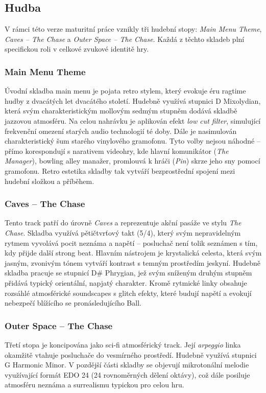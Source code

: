 \subsection{Hudba}
\label{sec:hudba}

V rámci této verze maturitní práce vznikly tři hudební stopy: \emph{Main Menu Theme}, \emph{Caves -- The Chase} a \emph{Outer Space -- The Chase}. Každá z těchto skladeb plní specifickou roli v celkové zvukové identitě hry.

\subsubsection{Main Menu Theme}
Úvodní skladba main menu je pojata retro stylem, který evokuje éru ragtime hudby z dvacátých let dvacátého století. Hudebně využívá stupnici D Mixolydian, která svým charakteristickým mollovým sedmým stupněm dodává skladbě jazzovou atmosféru. Na celou nahrávku je aplikován efekt \emph{low cut filter}, simulující frekvenční omezení starých audio technologií té doby. Dále je nasimulován charakteristický šum starého vinylového gramofonu. Tyto volby nejsou náhodné -- přímo korespondují s narativem videohry, kde hlavní komunikátor (\emph{The Manager}), bowling alley manažer, promlouvá k hráči (\emph{Pin}) skrze jeho sny pomocí gramofonu. Retro estetika skladby tak vytváří bezprostřední spojení mezi hudební složkou a příběhem.

\subsubsection{Caves -- The Chase}
Tento track patří do úrovně \emph{Caves} a reprezentuje akční pasáže ve stylu \emph{The Chase}. Skladba využívá pětičtvrťový takt (5/4), který svým nepravidelným rytmem vyvolává pocit neznáma a napětí -- posluchač není tolik seznámen s tím, kdy přijde další strong beat. Hlavním nástrojem je krystalická celesta, která svým jasným, zvonivým tónem vytváří kontrast s temným prostředím jeskyní. Hudebně skladba pracuje se stupnicí D\# Phrygian, jež svým sníženým druhým stupněm přidává typický orientální, napjatý charakter. Kromě rytmické linky obsahuje rozsáhlé atmosférické soundscapes s glitch efekty, které budují napětí a evokují nebezpečí blížícího se pronásledujícího Ball.

\subsubsection{Outer Space -- The Chase}
Třetí stopa je koncipována jako sci-fi atmosférický track. Její \emph{arpeggio} linka okamžitě vtahuje posluchače do vesmírného prostředí. Hudebně využívá stupnici G Harmonic Minor. V pozdější části skladby se objevují mikrotonální melodie využívající formát EDO 24 (24 rovnoměrných dělení oktávy), což dále posiluje atmosféru neznáma a surrealismu typickou pro celou hru.

